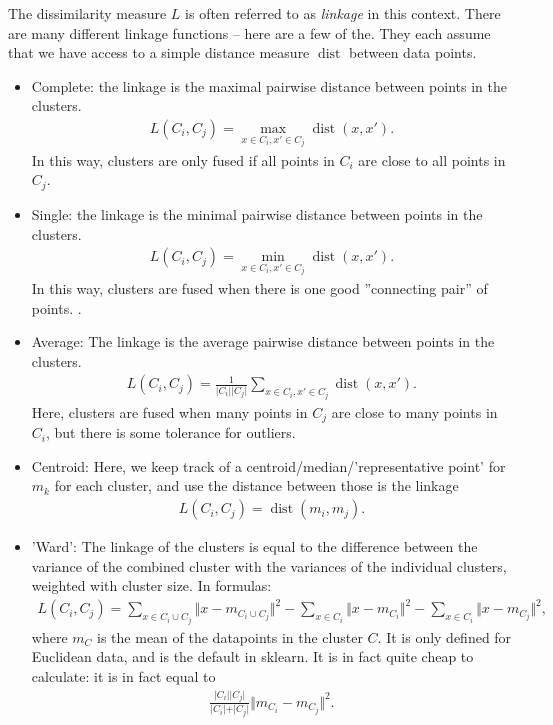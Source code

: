 \documentclass{article}
\newcommand{\abs}[1]{\vert #1 \vert}
\newcommand{\norm}[1]{\Vert #1 \Vert}
\DeclareMathOperator{\dist}{dist}
\begin{document}
The dissimilarity measure $L$ is often referred to as \emph{linkage} in this context. There are many different linkage functions -- here are a few of the. They each assume that we have access to a simple distance measure $\dist$ between data points.
\begin{itemize}
    \item Complete: the linkage is the maximal pairwise distance between points in the clusters.
    \begin{align}
        L(C_i,C_j) = \max_{x \in C_i,x'\in C_j} \dist(x,x').
    \end{align}
    In this way, clusters are only fused if all points in $C_i$ are close to all points in $C_j$.
    \item Single: the linkage is the minimal pairwise distance between points in the clusters.
    \begin{align*}
        L(C_i,C_j) = \min_{x\in C_i,x'\in C_j} \dist(x,x').
    \end{align*}
    In this way, clusters are fused when there is one good ''connecting pair'' of points. .
    \item Average: The linkage is the average pairwise distance between points in the clusters.
    \begin{align*}
        L(C_i,C_j) = \tfrac{1}{\abs{C_i}\abs{C_j}}\sum_{x\in C_i,x'\in C_j} \dist(x,x').
    \end{align*}
    Here, clusters are fused when many points in $C_j$ are close to many points in $C_i$, but there is some tolerance for outliers.
    \item Centroid: Here, we keep track of a centroid/median/'representative point' for $m_k$ for each cluster, and use the distance between those is the linkage
    \begin{align*}
        L(C_i,C_j) = \dist(m_i,m_j).
    \end{align*}
    \item 'Ward': The linkage of the clusters is equal to the difference between the variance of the combined cluster with the variances of the individual clusters, weighted with cluster size. In formulas:
        \begin{align*}
            L(C_i,C_j) = \sum_{x \in C_i \cup C_j} \norm{x-m_{C_i\cup C_j}}^2 - \sum_{x \in C_i} \norm{x-m_{C_i}}^2 - \sum_{x \in C_i} \norm{x-m_{C_j}}^2, 
        \end{align*}
        where $m_C$ is the mean of the datapoints in the cluster $C$. It is only defined for Euclidean data, and is the default in sklearn. It is in fact quite cheap to calculate: it is in fact equal to 
        \begin{align} \label{eq:ward_linkagew}
            \frac{\abs{C_i}\abs{C_j}}{\abs{C_i}+\abs{C_j}} \norm{m_{C_i}-m_{C_j}}^2.
        \end{align}
\end{itemize}
\end{document}

